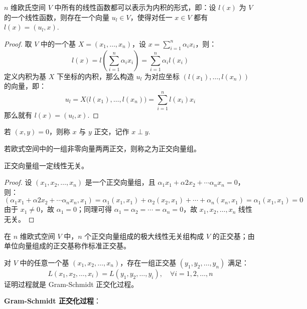 \begin{theorem}
$n$ 维欧氏空间 $V$ 中所有的线性函数都可以表示为内积的形式，即：设 $l(x)$ 为 $V$ 的一个线性函数，则存在一个向量 $u_l\in V$，使得对任一 $x\in V$ 都有 $l(x)=(u_l,x)$.
\end{theorem}
\begin{proof}
取 $V$ 中的一个基 $X=(x_1,\ldots,x_n)$，设 $x=\sum_{i=1}^n\alpha_ix_i$，则：
\[
    l(x)=l\left(\sum_{i=1}^n\alpha_ix_i\right)=\sum_{i=1}^n\alpha_i l(x_i)
\]
定义内积为基 $X$ 下坐标的内积，那么构造 $u_l$ 为对应坐标 $(l(x_1),\ldots,l(x_n))$ 的向量，即：
\[
    u_l=X\big(l(x_1),\ldots,l(x_n)\big)=\sum_{i=1}^nl(x_i)x_i
\]
那么就有 $l(x)=(u_l,x)$.
\end{proof}

\begin{definition}[正交]
若 $(x,y)=0$，则称 $x$ 与 $y$ 正交，记作 $x\perp y$.
\end{definition}
\begin{definition}[正交向量组]
若欧式空间中的一组非零向量两两正交，则称之为正交向量组。
\end{definition}

\begin{theorem}
\label{thm:perp-ind}
正交向量组一定线性无关。
\end{theorem}
\begin{proof}
设 $(x_1,x_2,\ldots,x_n)$ 是一个正交向量组，且 $\alpha_1x_1+\alpha2x_2+\cdots\alpha_nx_n=0$，则：
\[
    (\alpha_1x_1+\alpha2x_2+\cdots\alpha_nx_n,x_1)=\alpha_1(x_1,x_1)+\alpha_2(x_2,x_1)+\cdots+\alpha_n(x_n,x_1)=\alpha_1(x_1,x_1)=0
\]
由于 $x_1\neq 0$，故 $\alpha_1=0$；同理可得 $\alpha_1=\alpha_2=\cdots=\alpha_n=0$，故 $x_1,x_2,\ldots,x_n$ 线性无关。
\end{proof}

\begin{definition}
在 $n$ 维欧式空间 $V$ 中，$n$ 个正交向量组成的极大线性无关组构成 $V$ 的正交基；由单位向量组成的正交基称作标准正交基。
\end{definition}

\begin{theorem}[任意欧式空间中都存在一组正交基]
对 $V$ 中的任意一个基 $(x_1,x_2,\ldots,x_n)$，存在一组正交基 $(y_1,y_2,\ldots,y_n)$ 满足：
\[
L(x_1,x_2,\ldots,x_i)=L(y_1,y_2,\ldots,y_i),\quad\forall i=1,2,\ldots,n
\]
证明过程就是 Gram-Schmidt 正交化过程。
\end{theorem}

\vskip 6pt \noindent\textbf{Gram-Schmidt 正交化过程}：

